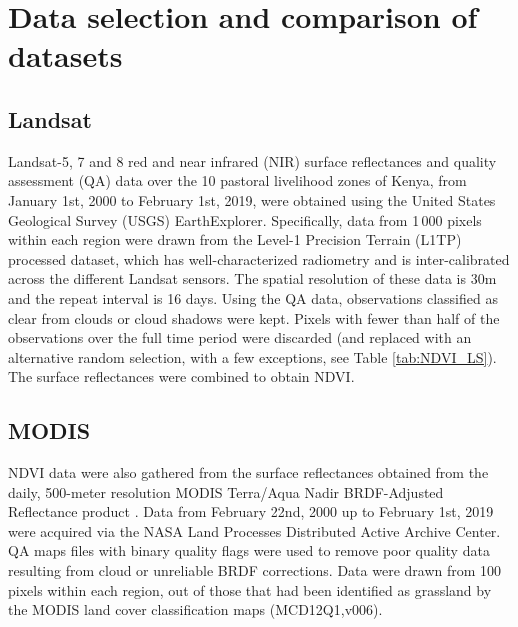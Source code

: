\documentclass[review]{elsarticle}
\begin{document}
\section{Data selection and comparison of datasets} \label{sec:datasets}

\subsection{Landsat}
Landsat-5, 7 and 8 \citep{royetal} red and near infrared (NIR) surface reflectances and quality assessment (QA) data over the 10 pastoral livelihood zones of Kenya, from January 1st, 2000 to February 1st, 2019, were obtained using the United States Geological Survey (USGS) EarthExplorer. Specifically, data from 1\,000 pixels within each region were drawn from the Level-1 Precision Terrain (L1TP) processed dataset, which has well-characterized radiometry and is inter-calibrated across the different Landsat sensors. The spatial resolution of these data is 30m and the repeat interval is 16 days. Using the QA data, observations classified as clear from clouds or cloud shadows were kept. Pixels with fewer than half of the observations over the full time period were discarded (and replaced with an alternative random selection, with a few exceptions, see Table \ref{tab:NDVI_LS}). %
The surface reflectances were combined to obtain 
NDVI. %

\subsection{MODIS}

NDVI data were also gathered from the surface reflectances obtained from the daily, 500-meter resolution MODIS Terra/Aqua Nadir BRDF-Adjusted Reflectance product \citep[MCD43A4,v006;][]{Schaaf2015}. Data from February 22nd, 2000 up to February 1st, 2019 were acquired via the NASA Land Processes Distributed Active Archive Center. QA maps files with binary quality flags were used to remove poor quality data resulting from cloud or unreliable BRDF corrections. Data were drawn from 100  pixels within each region, out of those that had been  identified  as grassland by the MODIS land cover classification maps (MCD12Q1,v006). 
\end{document}
